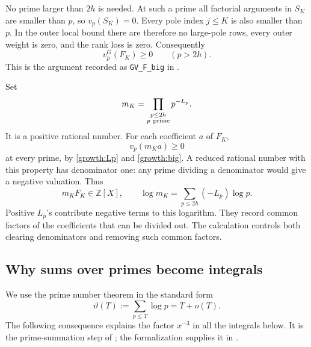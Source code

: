 No prime larger than \(2h\) is needed. At such a prime all factorial
arguments in \(S_K\) are smaller than \(p\), so \(v_p(S_K)=0\).
Every pole index \(j\le K\) is also smaller than \(p\). In the outer
local bound there are therefore no large-pole rows, every outer weight
is zero, and the rank loss is zero. Consequently
\begin{equation}\label{growth:big}
 v_p^G(F_K)\ge0\qquad(p>2h).
\end{equation}
This is the argument recorded as \texttt{GV\_F\_big} in
\cite[\texttt{Norm.lean}]{firsching}.

Set
\begin{equation}\label{growth:normalizer}
 m_K=\prod_{\substack{p\le2h\\p\ {\rm prime}}}p^{-L_p}.
\end{equation}
It is a positive rational number. For each coefficient \(a\) of \(F_K\),
\[
 v_p(m_Ka)\ge0
\]
at every prime, by \eqref{growth:Lp} and \eqref{growth:big}. A reduced
rational number with this property has denominator one: any prime
dividing a denominator would give a negative valuation. Thus
\begin{equation}\label{growth:integrality}
 m_KF_K\in\mathbb Z[X],\qquad
 \log m_K=\sum_{p\le2h}(-L_p)\log p.
\end{equation}
Positive \(L_p\)'s contribute negative terms to this logarithm. They
record common factors of the coefficients that can be divided out.
The calculation controls both clearing denominators and removing such
common factors.

\subsection{Why sums over primes become integrals}

We use the prime number theorem in the standard form
\[
 \vartheta(T):=\sum_{p\le T}\log p=T+o(T).
\]
The following consequence explains the factor \(x^{-3}\) in all the
integrals below. It is the prime-summation step of
\cite[Section 5]{fauzan}; the formalization supplies it in
\cite[\texttt{PrimeSum.lean}, \texttt{PrimeSumIntegral.lean}]{firsching}.


